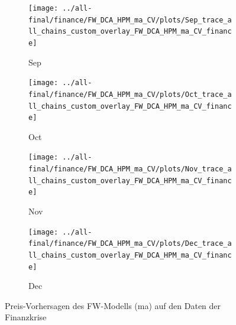 \documentclass[ngerman]{ttlab-qualify}
\begin{document}
\begin{figure}[H]
\begin{subfigure}{.3\linewidth}
  \texttt{[image: ../all-final/finance/FW\_DCA\_HPM\_ma\_CV/plots/Sep\_trace\_all\_chains\_custom\_overlay\_FW\_DCA\_HPM\_ma\_CV\_finance]}\hfill
  \caption{Sep}
  \end{subfigure}\par\medskip
  \begin{subfigure}{.3\linewidth}
  \texttt{[image: ../all-final/finance/FW\_DCA\_HPM\_ma\_CV/plots/Oct\_trace\_all\_chains\_custom\_overlay\_FW\_DCA\_HPM\_ma\_CV\_finance]}\hfill
  \caption{Oct}
  \end{subfigure}
  \begin{subfigure}{.3\linewidth}
  \texttt{[image: ../all-final/finance/FW\_DCA\_HPM\_ma\_CV/plots/Nov\_trace\_all\_chains\_custom\_overlay\_FW\_DCA\_HPM\_ma\_CV\_finance]}\hfill
  \caption{Nov}
  \end{subfigure}
  \begin{subfigure}{.3\linewidth}
  \texttt{[image: ../all-final/finance/FW\_DCA\_HPM\_ma\_CV/plots/Dec\_trace\_all\_chains\_custom\_overlay\_FW\_DCA\_HPM\_ma\_CV\_finance]}\hfill
  \caption{Dec}
  \end{subfigure}
  \caption{Preis-Vorhersagen des FW-Modells (ma) auf den Daten der Finanzkrise}
\end{figure}
\end{document}
